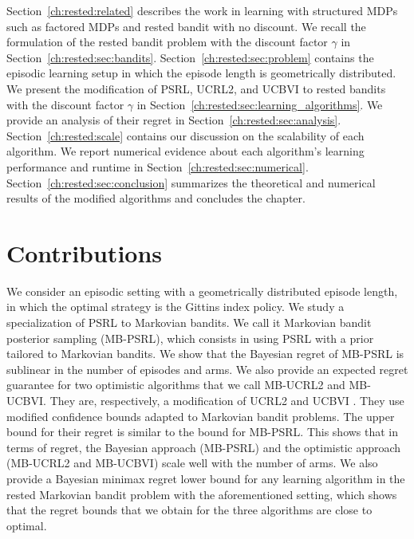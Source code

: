 Section~\ref{ch:rested:related} describes the work in learning with structured MDPs such as factored MDPs and rested bandit with no discount.
We recall the formulation of the rested bandit problem with the discount factor $\gamma$ in Section~\ref{ch:rested:sec:bandits}.
Section~\ref{ch:rested:sec:problem} contains the episodic learning setup in which the episode length is geometrically distributed.
We present the modification of PSRL, UCRL2, and UCBVI to rested bandits with the discount factor $\gamma$ in Section~\ref{ch:rested:sec:learning_algorithms}.
We provide an analysis of their regret in Section~\ref{ch:rested:sec:analysis}.
Section~\ref{ch:rested:scale} contains our discussion on the scalability of each algorithm.
We report numerical evidence about each algorithm's learning performance and runtime in Section~\ref{ch:rested:sec:numerical}.
Section~\ref{ch:rested:sec:conclusion} summarizes the theoretical and numerical results of the modified algorithms and concludes the chapter.

\section{Contributions}
\label{ch:rested:sec:contribute}

We consider an episodic setting with a geometrically distributed episode length, in which the optimal strategy is the Gittins index policy. %
We study a specialization of PSRL \cite{osband2013more} to Markovian bandits.
We call it Markovian bandit posterior sampling (MB-PSRL), which consists in using PSRL with a prior tailored to Markovian bandits.
We show that the Bayesian regret of MB-PSRL is sublinear in the number of episodes and arms. We also provide an expected regret guarantee for two optimistic algorithms that we call MB-UCRL2 and MB-UCBVI.
They are, respectively, a modification of UCRL2 \cite{jaksch2010near} and UCBVI \cite{azar2017minimax}.
They use modified confidence bounds adapted to Markovian bandit problems. The upper bound for their regret is similar to the bound for MB-PSRL. This shows that in terms of regret, the Bayesian approach (MB-PSRL) and the optimistic approach (MB-UCRL2 and MB-UCBVI) scale well with the number of arms. We also provide a Bayesian minimax regret lower bound for any learning algorithm in the rested Markovian bandit problem with the aforementioned setting, which shows that the regret bounds that we obtain for the three algorithms are close to optimal.

